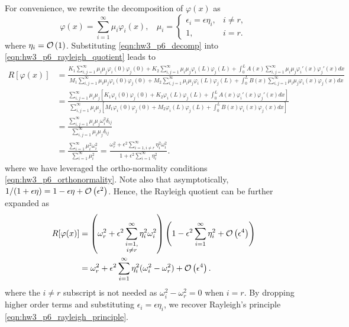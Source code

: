 For convenience, we rewrite the decomposition of $\varphi(x)$ as 
\begin{equation}\label{eqn:hw3_p6_decomp}
    \varphi(x) = \sum_{i=1}^\infty \mu_i \varphi_i(x), ~~~~ \mu_i = \begin{cases}
        \epsilon_i = \epsilon \eta_i, & i \neq r, \\
        1, & i = r.
    \end{cases}
\end{equation}
where $\eta_i = \mathcal{O} \left( 1 \right)$.
Substituting \cref{eqn:hw3_p6_decomp} into \cref{eqn:hw3_p6_rayleigh_quotient} leads to
\begin{equation}
\begin{aligned}
    R[\varphi(x)] &= \frac{
        K_1 \sum_{i,j=1}^\infty \mu_i\mu_j\varphi_i(0)\varphi_j(0) + K_2 \sum_{i,j=1}^\infty \mu_i\mu_j\varphi_i(L)\varphi_j(L) + \int_0^L A(x) \sum_{i,j=1}^\infty \mu_i\mu_j\varphi_i'(x) \varphi_j'(x) dx
    }{
        M_1 \sum_{i,j=1}^\infty \mu_i\mu_j\varphi_i(0)\varphi_j(0) + M_2 \sum_{i,j=1}^\infty \mu_i\mu_j\varphi_i(L)\varphi_j(L) + \int_0^L B(x) \sum_{i,j=1}^\infty \mu_i\mu_j\varphi_i(x) \varphi_j(x) dx
    } \\
    &= \frac{
        \sum_{i,j=1}^\infty \mu_i \mu_j \left[ K_1\varphi_i(0) \varphi_j(0) + K_2\varphi_i(L) \varphi_j(L) + \int_0^L A(x) \varphi_i'(x) \varphi_j'(x) dx \right]
    }{
        \sum_{i,j=1}^\infty \mu_i \mu_j \left[ M_1\varphi_i(0) \varphi_j(0) + M_2\varphi_i(L) \varphi_j(L) + \int_0^L B(x) \varphi_i(x) \varphi_j(x) dx \right]
    } \\
    &= \frac{
        \sum_{i,j=1}^\infty \mu_i \mu_j \omega_i^2 \delta_{ij}
    }{
        \sum_{i,j=1}^\infty \mu_i \mu_j \delta_{ij}
    } \\
    &= \frac{\sum_{i=1}^\infty \mu_i^2 \omega_i^2}{\sum_{i=1}^\infty \mu_i^2} = \frac{\omega_r^2 + \epsilon^2\sum_{i=1, i\neq r}^\infty \eta_i^2 \omega_i^2}{1 + \epsilon^2 \sum_{i=1}^\infty \eta_i^2}.
\end{aligned}
\end{equation}
where we have leveraged the ortho-normality conditions \cref{eqn:hw3_p6_orthonormality}.
Note also that asymptotically, $1 / (1 + \epsilon \eta) = 1 - \epsilon \eta + \mathcal{O} \left( \epsilon^2 \right)$.
Hence, the Rayleigh quotient can be further expanded as 
\begin{equation}
\begin{aligned}
    R[\varphi(x)] &= \left(\omega_r^2 + \epsilon^2 \sum_{\substack{i=1, \\ i\neq r}}^\infty \eta_i^2 \omega_i^2\right) \left(1 - \epsilon^2 \sum_{i=1}^\infty \eta_i^2 + \mathcal{O} \left( \epsilon^4 \right) \right) \\
    &= \omega_r^2 + \epsilon^2 \sum_{i=1}^\infty \eta_i^2 (\omega_i^2 - \omega_r^2) + \mathcal{O} \left( \epsilon^4 \right).
\end{aligned}
\end{equation}
where the $i\neq r$ subscript is not needed as $\omega_i^2 - \omega_r^2 = 0$ when $i = r$.
By dropping higher order terms and substituting $\epsilon_i = \epsilon \eta_i$, we recover Rayleigh's principle \cref{eqn:hw3_p6_rayleigh_principle}.
